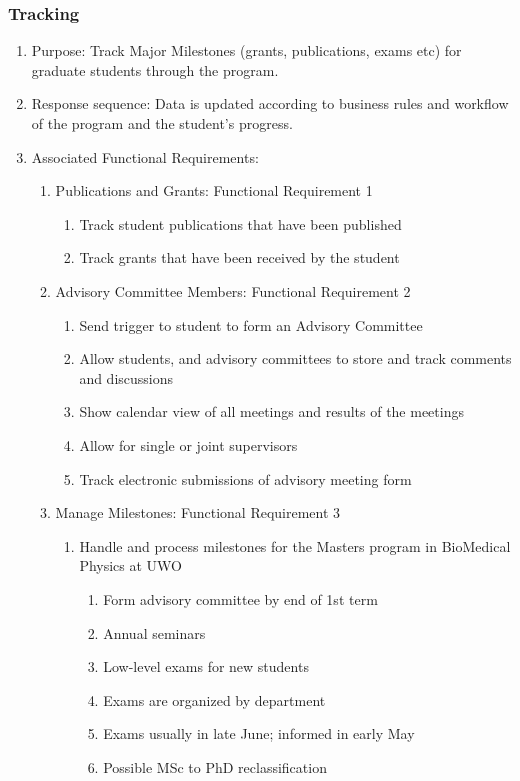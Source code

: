 \documentclass{journal}
\begin{document}
\subsubsection{Tracking}
\begin{enumerate}
\item Purpose: Track Major Milestones (grants, publications, exams etc) for graduate students through the program.
\item Response sequence: Data is updated according to business rules and workflow of the program and the student's progress.
\item Associated Functional Requirements:
\begin{enumerate}
\item Publications and Grants: Functional Requirement 1
\begin{enumerate}
\item Track student publications that have been published 
\item Track grants that have been received by the student
\end{enumerate}
\item Advisory Committee Members: Functional Requirement 2
\begin{enumerate}
\item Send trigger to student to form an Advisory Committee
\item Allow students, and advisory committees to store and track comments and discussions
\item Show calendar view of all meetings and results of the meetings
\item Allow for single or joint supervisors 
\item Track electronic submissions of advisory meeting form
\end{enumerate}
\item Manage Milestones: Functional Requirement 3
\begin{enumerate}
\item Handle and process milestones for the Masters program in BioMedical Physics at UWO
\begin{enumerate}
\item Form advisory committee by end of 1st term
\item Annual seminars 
\item Low-level exams for new students
\item Exams are organized by department
\item Exams usually in late June; informed in early May
\item Possible MSc to PhD reclassification

\end{enumerate}
\end{enumerate}
\end{enumerate}
\end{enumerate}
\end{document}
